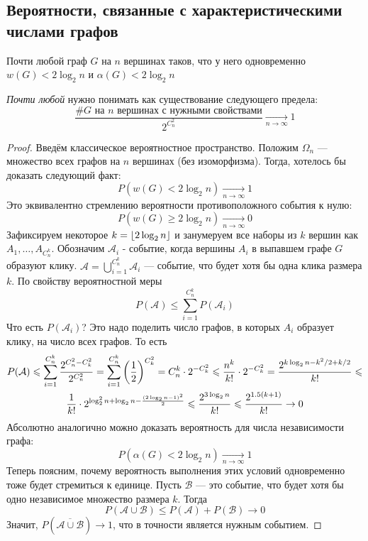 \subsection{Вероятности, связанные с характеристическими числами графов}

\begin{theorem}
	Почти любой граф $G$ на $n$ вершинах таков, что у него одновременно $w(G) < 2\log_2 n$ и $\alpha(G) < 2\log_2 n$
\end{theorem}

\begin{note}
	\textit{Почти любой} нужно понимать как существование следующего предела:
	\[
		\frac{\text{\#$G$ на $n$ вершинах с нужными свойствами}}{2^{C_n^2}} \xrightarrow[n \to \infty]{} 1
	\]
\end{note}

\begin{proof}
	Введём классическое вероятностное пространство. Положим $\Omega_n$ --- множество всех графов на $n$ вершинах (без изоморфизма). Тогда, хотелось бы доказать следующий факт:
	\[
		P(w(G) < 2\log_2 n) \xrightarrow[n \to \infty]{} 1
	\]
	Это эквивалентно стремлению вероятности противоположного события к нулю:
	\[
		P(w(G) \ge 2\log_2 n) \xrightarrow[n \to \infty]{} 0
	\]
	Зафиксируем некоторое $k = \left\lfloor 2\log_2 n \right\rfloor$ и занумеруем все наборы из $k$ вершин как $A_1, \ldots, A_{C_n^k}$. Обозначим $\mathcal{A}_i$ - событие, когда вершины $A_i$ в выпавшем графе $G$ образуют клику. $\mathcal{A} = \bigcup_{i = 1}^{C_n^k} \mathcal{A}_i$  --- событие, что будет хотя бы одна клика размера $k$. По свойству вероятностной меры
	\[
		P(\mathcal{A}) \le \sum_{i = 1}^{C_n^k} P(\mathcal{A}_i)
	\]
	Что есть $P(\mathcal{A}_i)$? Это надо поделить число графов, в которых $A_i$ образует клику, на число всех графов. То есть
	\begin{multline*}
		P(\mathcal{A}) \leqslant \sum_{i = 1}^{C_n^k} \frac{2^{C_n^2 - C_k^2}}{2^{C_n^2}} = \sum_{i = 1}^{C_n^k} \left(\frac{1}{2}\right)^{C_k^2} = C_n^k \cdot 2^{-C_k^2} \leqslant \frac{n^k}{k!} \cdot 2^{-C_k^2} = \frac{2^{k \log_2 n - k^2 / 2 + k / 2}}{k!} \leqslant
		\\
		\frac{1}{k!} \cdot 2^{\log^2_2 n + \log_2 n - \frac{(2\log_2 n - 1)^2}{2}} \leqslant \frac{2^{3\log_2 n}}{k!} \leqslant \frac{2^{1.5(k + 1)}}{k!} \to 0
	\end{multline*}
	Абсолютно аналогично можно доказать вероятность для числа независимости графа:
	\[
		P(\alpha(G) < 2\log_2 n) \xrightarrow[n \to \infty]{} 1
	\]
	Теперь поясним, почему вероятность выполнения этих условий одновременно тоже будет стремиться к единице. Пусть $\mathcal{B}$ --- это событие, что будет хотя бы одно независимое множество размера $k$. Тогда
	\[
		P(\mathcal{A} \cup \mathcal{B}) \le P(\mathcal{A}) + P(\mathcal{B}) \to 0
	\]
	Значит, $P(\overline{\mathcal{A} \cup \mathcal{B}}) \to 1$, что в точности является нужным событием.
\end{proof}

